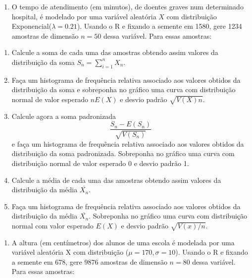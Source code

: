 \documentclass[
]{book}
\providecommand{\tightlist}{%
  \setlength{\itemsep}{0pt}\setlength{\parskip}{0pt}}
\begin{document}
\begin{enumerate}
\def\labelenumi{\arabic{enumi}.}
\setcounter{enumi}{16}
\tightlist
\item
  O tempo de atendimento (em minutos), de doentes graves num determinado hospital, é modelado por uma variável aleatória \(X\) com distribuição Exponencial(\(\lambda=0.21\)). Usando o R e fixando a semente em 1580, gere 1234 amostras de dimensão \(n=50\) dessa variável. Para essas amostras:
\end{enumerate}

\begin{enumerate}
\def\labelenumi{(\alph{enumi})}
\item
  Calcule a soma de cada uma das amostras obtendo assim valores da distribuição da soma \(S_{n} = \sum_{i=1}^{n}X_{n}\).
\item
  Faça um histograma de frequência relativa associado aos valores obtidos da distribuição da soma e sobreponha no gráfico uma curva com distribuição normal de valor esperado \(nE(X)\) e desvio padrão \(\sqrt{V(X)n}\).
\item
  Calcule agora a soma padronizada \[\frac{S_{n}-E(S_{n})}{\sqrt{V(S_{n})}}\] e faça um histograma de frequência relativa associado aos valores obtidos da distribuição da soma padronizada. Sobreponha no gráfico uma curva com distribuição normal de valor esperado 0 e desvio padrão 1.
\item
  Calcule a média de cada uma das amostras obtendo assim valores da distribuição da média \(\bar{X_{n}}\).
\item
  Faça um histograma de frequência relativa associado aos valores obtidos da distribuição da média \(\bar{X_{n}}\). Sobreponha no gráfico uma curva com distribuição normal com valor esperado \(E(X)\) e desvio padrão \(\sqrt{V(x)/n}\).
\end{enumerate}

\begin{enumerate}
\def\labelenumi{\arabic{enumi}.}
\setcounter{enumi}{17}
\tightlist
\item
  A altura (em centímetros) dos alunos de uma escola é modelada por uma variável aleatória X com distribuição (\(\mu=170, \sigma=10\)). Usando o R e fixando a semente em 678, gere 9876 amostras de dimensão \(n=80\) dessa variável. Para essas amostras:
\end{enumerate}
\end{document}
